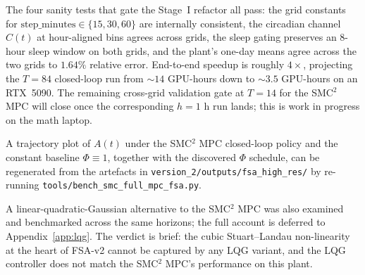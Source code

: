 The four sanity tests that gate the Stage~I refactor all pass: the
grid constants for $\mathrm{step\_minutes} \in \{15,30,60\}$ are
internally consistent, the circadian channel $C(t)$ at hour-aligned
bins agrees across grids, the sleep gating preserves an $8$-hour
sleep window on both grids, and the plant's one-day means agree
across the two grids to $1.64\%$ relative error. End-to-end speedup
is roughly $4\times$, projecting the $T = 84$ closed-loop run from
$\sim\!14$ GPU-hours down to $\sim\!3.5$ GPU-hours on an RTX~5090.
The remaining cross-grid validation gate at $T = 14$ for the
SMC${}^2$ MPC will close once the corresponding $h = 1$ h run lands;
this is work in progress on the math laptop.

\medskip
\noindent
A trajectory plot of $A(t)$ under the SMC${}^2$ MPC closed-loop
policy and the constant baseline $\Phi \equiv 1$, together with the
discovered $\Phi$ schedule, can be regenerated from the artefacts in
\texttt{version\_2/outputs/fsa\_high\_res/} by re-running
\texttt{tools/bench\_smc\_full\_mpc\_fsa.py}.

\medskip
\noindent
A linear-quadratic-Gaussian alternative to the SMC${}^2$ MPC was
also examined and benchmarked across the same horizons; the full
account is deferred to Appendix~\ref{app:lqg}. The verdict is brief:
the cubic Stuart--Landau non-linearity at the heart of FSA-v2 cannot
be captured by any LQG variant, and the LQG controller does not
match the SMC${}^2$ MPC's performance on this plant.
